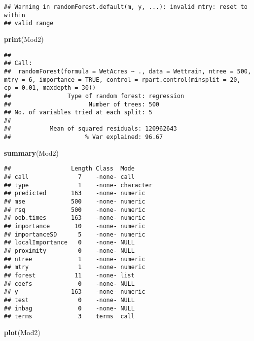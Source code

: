 \documentclass[]{article}
\newenvironment{Shaded}{\begin{snugshade}}{\end{snugshade}}
\newcommand{\KeywordTok}[1]{\textcolor[rgb]{0.13,0.29,0.53}{\textbf{{#1}}}}
\newcommand{\NormalTok}[1]{{#1}}
\begin{document}
\begin{verbatim}
## Warning in randomForest.default(m, y, ...): invalid mtry: reset to within
## valid range
\end{verbatim}

\begin{Shaded}
\begin{Highlighting}[]
\KeywordTok{print}\NormalTok{(Mod2)}
\end{Highlighting}
\end{Shaded}

\begin{verbatim}
## 
## Call:
##  randomForest(formula = WetAcres ~ ., data = Wettrain, ntree = 500,      mtry = 6, importance = TRUE, control = rpart.control(minsplit = 20,          cp = 0.01, maxdepth = 30)) 
##                Type of random forest: regression
##                      Number of trees: 500
## No. of variables tried at each split: 5
## 
##           Mean of squared residuals: 120962643
##                     % Var explained: 96.67
\end{verbatim}

\begin{Shaded}
\begin{Highlighting}[]
\KeywordTok{summary}\NormalTok{(Mod2)}
\end{Highlighting}
\end{Shaded}

\begin{verbatim}
##                 Length Class  Mode     
## call              7    -none- call     
## type              1    -none- character
## predicted       163    -none- numeric  
## mse             500    -none- numeric  
## rsq             500    -none- numeric  
## oob.times       163    -none- numeric  
## importance       10    -none- numeric  
## importanceSD      5    -none- numeric  
## localImportance   0    -none- NULL     
## proximity         0    -none- NULL     
## ntree             1    -none- numeric  
## mtry              1    -none- numeric  
## forest           11    -none- list     
## coefs             0    -none- NULL     
## y               163    -none- numeric  
## test              0    -none- NULL     
## inbag             0    -none- NULL     
## terms             3    terms  call
\end{verbatim}

\begin{Shaded}
\begin{Highlighting}[]
\KeywordTok{plot}\NormalTok{(Mod2)}
\end{Highlighting}
\end{Shaded}
\end{document}
